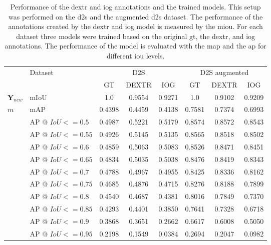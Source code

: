 \begin{table}[h!]
	\centering
	\begin{tabular}{ ll|c c c|c c c}
		\toprule
								& Dataset				& \multicolumn{3}{c}{D2S} 			& \multicolumn{3}{c}{D2S augmented} \\		 
								& 						& GT		& DEXTR		& IOG		& GT		& DEXTR		& IOG		\\
		\midrule
		$ \textbf{Y}_{new} $ 	& mIoU 					& 1.0		& 0.9554	& 0.9271	& 1.0		& 0.9102	& 0.9209	\\
		\midrule
		$ m $					& mAP 					& 0.4398	& 0.4459	& 0.4138	& 0.7581	& 0.7374	& 0.6993	\\
		
								& AP @ $ IoU <= 0.5 $	& 0.4987	& 0.5221	& 0.5179	& 0.8574	& 0.8572	& 0.8543	\\
								& AP @ $ IoU <= 0.55 $ 	& 0.4926	& 0.5145	& 0.5135	& 0.8565	& 0.8518	& 0.8502	\\
								& AP @ $ IoU <= 0.6 $	& 0.4859	& 0.5063	& 0.5083	& 0.8526	& 0.8471	& 0.8451	\\
								& AP @ $ IoU <= 0.65 $ 	& 0.4834	& 0.5035	& 0.5038	& 0.8476	& 0.8419	& 0.8343	\\
								& AP @ $ IoU <= 0.7 $	& 0.4788	& 0.4967	& 0.4955	& 0.8425	& 0.8336	& 0.8162	\\
								& AP @ $ IoU <= 0.75 $ 	& 0.4685	& 0.4876	& 0.4715	& 0.8276	& 0.8188	& 0.7899	\\
								& AP @ $ IoU <= 0.8 $	& 0.4540	& 0.4687	& 0.4381	& 0.8016	& 0.7849	& 0.7370	\\
								& AP @ $ IoU <= 0.85 $ 	& 0.4293	& 0.4401	& 0.3850	& 0.7641	& 0.7328	& 0.6718	\\
								& AP @ $ IoU <= 0.9 $	& 0.3868	& 0.3651	& 0.2662	& 0.6617	& 0.6008	& 0.5050	\\
								& AP @ $ IoU <= 0.95 $ 	& 0.2198	& 0.1549	& 0.0384	& 0.2694	& 0.2047	& 0.0982	\\
		\bottomrule
	\end{tabular}
	\caption[Performance of models trained with DEXTR and IOG annotations]{
		Performance of the \gls{dextr} and \gls{iog} annotations and the trained models.
		This setup was performed on the \gls{d2s} and the augmented \gls{d2s} dataset.
		The performance of the annotations created by the \gls{dextr} and \gls{iog} model is measured by the \gls{miou}.
		For each dataset three models were trained based on the original \gls{gt}, the \gls{dextr}, and \gls{iog} annotations.
		The performance of the model is evaluated with the \gls{map} and the \gls{ap} for different \gls{iou} levels.		
	}\label{tab:ch5:results_annot_usability}
\end{table}


